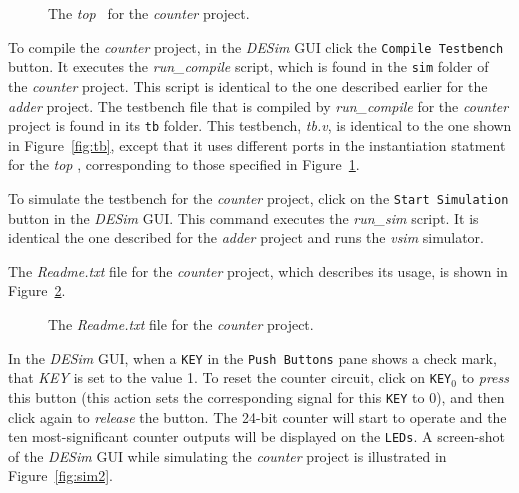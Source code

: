 {\begin{figure}[h]
\begin{center}
\begin{minipage}[h]{15 cm}
	{}
	{}
\end{minipage}
	\caption{The {\it top} \hdlModuleName~for the {\it counter} project.}
	\label{fig:counter_top}
\end{center}
\end{figure}

To compile the {\it counter} project, in the {\it DESim} GUI click the \texttt{Compile Testbench}
button. It executes the {\it run\_compile} script, which
is found in the \texttt{sim} folder of the {\it counter} project. This script 
is identical to the one described earlier for the {\it adder} project. 
The testbench file that is compiled by {\it run\_compile} for the {\it counter} project is  
found in its \texttt{tb} folder. This testbench, {\it tb.v}, is identical to the one shown 
in Figure~\ref{fig:tb}, except that it uses different ports in the instantiation statment
for the {\it top} \hdlModuleName, corresponding to those specified in 
Figure~\ref{fig:counter_top}.

To simulate the testbench for the {\it counter} project, click on the
\texttt{Start Simulation} button in the {\it DESim} GUI. This command executes the
{\it run\_sim} script. It is identical the one described for the 
{\it adder} project and runs the {\it vsim} simulator.

The {\it Readme.txt} file for the {\it counter} project, which describes its usage,
is shown in Figure~\ref{fig:readme_counter}. 

\begin{figure}[H]
\begin{center}
\begin{minipage}[t]{15 cm}
	
\end{minipage}
    \caption{The {\it Readme.txt} file for the {\it counter} project.}
	\label{fig:readme_counter}
\end{center}
\end{figure}

In the {\it DESim} GUI, when a \texttt{KEY} in the \texttt{Push Buttons} pane shows a check mark,
that {\it KEY} is set to the value 1. To reset the counter circuit, 
click on \texttt{KEY}$_0$ to {\it press} this button (this action sets the corresponding 
signal for this \texttt{KEY} to 0), and then click again to {\it release} the button. 
The 24-bit counter will start to operate and the ten
most-significant counter outputs will be displayed on the \texttt{LEDs}. A screen-shot of
the {\it DESim} GUI while simulating the {\it counter} project is illustrated in 
Figure~\ref{fig:sim2}.

}
